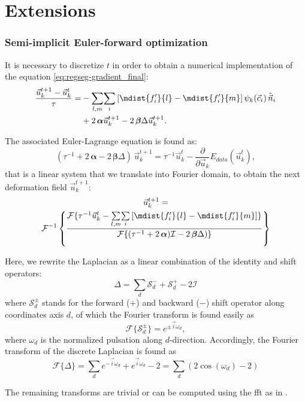 
\section{Extensions}

\subsubsection{Semi-implicit Euler-forward optimization}
It is necessary to discretize $t$ in order to obtain a numerical
implementation of the equation \eqref{eq:regseg-gradient_final}:
\begin{align}
\frac{\vec{u}_k^{t+1}-\vec{u}_k^t}{\tau} =
&- \underset{l,m}{\sum} \underset{i}{\sum}
\left[ \mdist{f_i'}{l} - \mdist{f_i'}{m}\right]
\psi_k(\vec{c}_i)\, \hat{\vec{n}}_i \notag\\
&+2\, \boldsymbol{\alpha} \vec{u}_k^{t+1}
-2\, \boldsymbol{\beta} \Delta \vec{u}_k^{t+1}.
\end{align}

The associated Euler-Lagrange equation is found as:
\begin{equation}
(\tau^{-1} +2\, \boldsymbol{\alpha} - 2\, \boldsymbol{\beta} \Delta )\, \vec{u}_k^{t+1} =
\tau^{-1} \vec{u}_k^t - \frac{\partial}{\partial \vec{u}_k} E_{data}(\vec{u}_k^t),
\end{equation}
that is a linear system that we translate into Fourier domain,
to obtain the next deformation field $\vec{u}_k^{t+1}$:
\begin{multline}
\vec{u}_k^{t+1} = \\
 \mathcal{F}^{-1} \left\lbrace
\frac{\mathcal{F}\lbrace \tau^{-1}\vec{u}_{k}^{t} - \underset{l,m}{\sum} \underset{i}{\sum}
\left[ \mdist{f_i'}{l} - \mdist{f_i'}{m}\right] \rbrace}
     {\mathcal{F}\lbrace (\tau^{-1} +2\,\boldsymbol{\alpha})\mathcal{I} - 2\,\boldsymbol{\beta} \Delta ) \rbrace}
     \right\rbrace
\end{multline}

Here, we rewrite the Laplacian as a linear combination of the identity and shift operators:
\begin{equation}
\Delta = \sum\limits_d \mathcal{S}_d^- + \mathcal{S}_d^+ - 2 \mathcal{I}
\end{equation}
where $\mathcal{S}_{d}^{\pm}$ stands for the forward ($+$) and backward ($-$) shift
operator along coordinates axis $d$, of which the Fourier transform is found easily as
\begin{equation}
\mathcal{F}\{\mathcal{S}_{d}^{\pm}\} = e^{\pm \vec{i}\omega_{d}},
\end{equation}
where $\omega_{d}$ is the normalized pulsation along $d$-direction. Accordingly, the
Fourier transform of the discrete Laplacian is found as
\begin{equation}
\mathcal{F}\{\Delta\} = \sum\limits_d e^{-\vec{i}\omega_d } + e^{\vec{i}\omega_d } - 2 = \sum\limits_d \left( 2\cos(\omega_d) - 2 \right)
\end{equation}

The remaining transforms are trivial or can be computed using the \gls{fft}
as in \citep{estellers_efficient_2011}.
